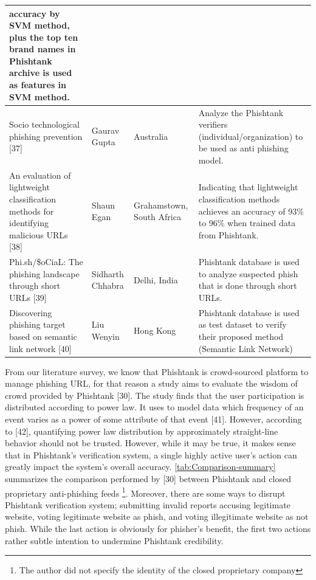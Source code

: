 \begin{longtable}{>{\raggedright}p{3cm}>{\raggedright}p{2cm}>{\raggedright}p{2cm}>{\raggedright}p{5cm}}
{accuracy by SVM method, plus the top ten brand names in Phishtank
archive is used as features in SVM method.}\tabularnewline
\midrule 
{\scriptsize{}Socio technological phishing prevention {[}37{]}} & {\scriptsize{}Gaurav Gupta} & {\scriptsize{}Australia} & {\scriptsize{}Analyze the Phishtank verifiers (individual/organization)
to be used as anti phishing model.}\tabularnewline
\midrule 
{\scriptsize{}An evaluation of lightweight classification methods
for identifying malicious URLs {[}38{]}} & {\scriptsize{}Shaun Egan} & {\scriptsize{}Grahamstown, South Africa} & {\scriptsize{}Indicating that lightweight classification methods achieves
an accuracy of 93\% to 96\% when trained data from Phishtank.}\tabularnewline
\midrule 
{\scriptsize{}Phi.sh/\$oCiaL: The phishing landscape through short
URLs {[}39{]}} & {\scriptsize{}Sidharth Chhabra} & {\scriptsize{}Delhi, India} & {\scriptsize{}Phishtank database is used to analyze suspected phish
that is done through short URLs.}\tabularnewline
\midrule 
{\scriptsize{}Discovering phishing target based on semantic link network
{[}40{]}} & {\scriptsize{}Liu Wenyin} & {\scriptsize{}Hong Kong} & {\scriptsize{}Phishtank database is used as test dataset to verify
their proposed method (Semantic Link Network) }\tabularnewline
\end{longtable}

From our literature survey, we know that Phishtank is crowd-sourced
platform to manage phishing URL, for that reason a study aims to evaluate
the wisdom of crowd provided by Phishtank {[}30{]}. The study finds
that the user participation is distributed according to power law.
It uses to model data which frequency of an event varies as a power
of some attribute of that event {[}41{]}. However, according to {[}42{]},
quantifying power law distribution by approximately straight-line
behavior should not be trusted. However, while it may be true, it
makes sense that in Phishtank\textquoteright s verification system,
a single highly active user\textquoteright s action can greatly impact
the system\textquoteright s overall accuracy. \autoref{tab:Comparison-summary}
summarizes the comparison performed by {[}30{]} between Phishtank
and closed proprietary anti-phishing feeds%
\footnote{The author did not specify the identity of the closed proprietary
company%
}. Moreover, there are some ways to disrupt Phishtank verification
system; submitting invalid reports accusing legitimate website, voting
legitimate website as phish, and voting illegitimate website as not
phish. While the last action is obviously for phisher\textquoteright s
benefit, the first two actions rather subtle intention to undermine
Phishtank credibility.

